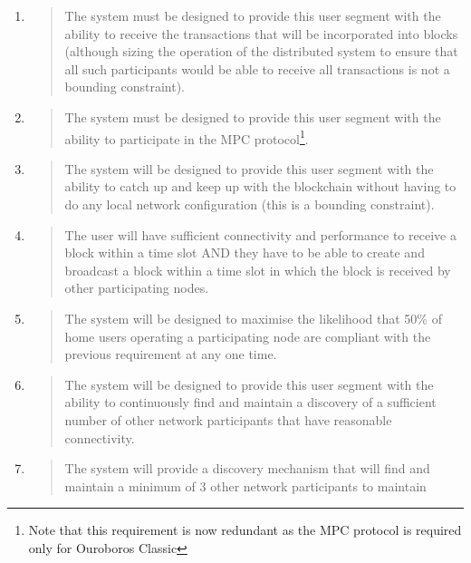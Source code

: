 \documentclass[]{article}
\begin{document}
\begin{enumerate}
\def\labelenumi{\arabic{enumi}.}
\item
  \begin{quote}
  The system must be designed to provide this user segment with the
  ability to receive the transactions that will be incorporated into
  blocks (although sizing the operation of the distributed system to
  ensure that all such participants would be able to receive all
  transactions is not a bounding constraint).
  \end{quote}
\item
  \begin{quote}
  The system must be designed to provide this user segment with the
  ability to participate in the MPC protocol\footnote{Note that this
    requirement is now redundant as the MPC protocol is required only
    for Ouroboros Classic}.
  \end{quote}
\item
  \begin{quote}
  The system will be designed to provide this user segment with the
  ability to catch up and keep up with the blockchain without having to
  do any local network configuration (this is a bounding constraint).
  \end{quote}
\item
  \begin{quote}
  The user will have sufficient connectivity and performance to receive
  a block within a time slot AND they have to be able to create and
  broadcast a block within a time slot in which the block is received by
  other participating nodes.
  \end{quote}
\item
  \begin{quote}
  The system will be designed to maximise the likelihood that 50\% of
  home users operating a participating node are compliant with the
  previous requirement at any one time.
  \end{quote}
\item
  \begin{quote}
  The system will be designed to provide this user segment with the
  ability to continuously find and maintain a discovery of a sufficient
  number of other network participants that have reasonable
  connectivity.
  \end{quote}
\item
  \begin{quote}
  The system will provide a discovery mechanism that will find and
  maintain a minimum of 3 other network participants to maintain

\end{quote}
\end{enumerate}
\end{document}
